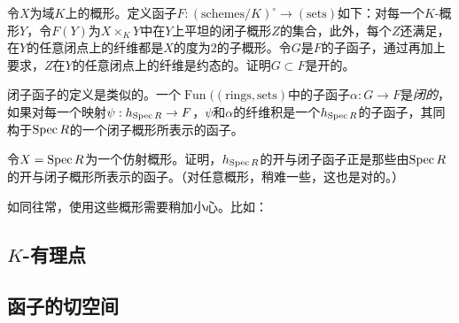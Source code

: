 \begin{exe} \label{exe:6.7}
	令$X$为域$K$上的概形。定义函子$F:(\text{schemes}/K)^\circ \to (\text{sets})$如下：对每一个$K$-概形$Y$，令$F(Y)$为$X\times_K Y$中在$Y$上平坦的闭子概形$Z$的集合，此外，每个$Z$还满足，在$Y$的任意闭点上的纤维都是$X$的度为$2$的子概形。令$G$是$F$的子函子，通过再加上要求，$Z$在$Y$的任意闭点上的纤维是约态的。证明$G\subset F$是开的。
\end{exe}

闭子函子的定义是类似的。一个$\operatorname{Fun}((\text{rings},\text{sets})$中的子函子$\alpha : G\to F$是\textit{闭的}，如果对每一个映射$\psi:h_{\operatorname{Spec} R}\to F$，$\psi$和$\alpha$的纤维积是一个$h_{\operatorname{Spec} R}$的子函子，其同构于$\operatorname{Spec} R$的一个闭子概形所表示的函子。

\begin{exe} \label{exe:6.8}
	令$X=\operatorname{Spec} R$为一个仿射概形。证明，$h_{\operatorname{Spec} R}$的开与闭子函子正是那些由$\operatorname{Spec} R$的开与闭子概形所表示的函子。（对任意概形，稍难一些，这也是对的。）
\end{exe}

如同往常，使用这些概形需要稍加小心。比如：

\nottran



\subsection{$K$-有理点} \label{s:6.1.2}
\subsection{函子的切空间} \label{s:6.1.3}